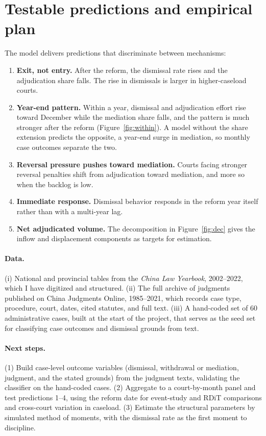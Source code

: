 \documentclass[11pt,letterpaper]{article}
\begin{document}
\section{Testable predictions and empirical plan}\label{sec:predictions}

The model delivers predictions that discriminate between mechanisms:
\begin{enumerate}\itemsep0.1em
\item \textbf{Exit, not entry.} After the reform, the dismissal rate rises and the adjudication share falls. The rise in dismissals is larger in higher-caseload courts.
\item \textbf{Year-end pattern.} Within a year, dismissal and adjudication effort rise toward December while the mediation share falls, and the pattern is much stronger after the reform (Figure~\ref{fig:within}). A model without the share extension predicts the opposite, a year-end surge in mediation, so monthly case outcomes separate the two.
\item \textbf{Reversal pressure pushes toward mediation.} Courts facing stronger reversal penalties shift from adjudication toward mediation, and more so when the backlog is low.
\item \textbf{Immediate response.} Dismissal behavior responds in the reform year itself rather than with a multi-year lag.
\item \textbf{Net adjudicated volume.} The decomposition in Figure~\ref{fig:dec} gives the inflow and displacement components as targets for estimation.
\end{enumerate}

\paragraph{Data.} (i) National and provincial tables from the \emph{China Law Yearbook}, 2002--2022, which I have digitized and structured. (ii) The full archive of judgments published on China Judgments Online, 1985--2021, which records case type, procedure, court, dates, cited statutes, and full text. (iii) A hand-coded set of 60 administrative cases, built at the start of the project, that serves as the seed set for classifying case outcomes and dismissal grounds from text.

\paragraph{Next steps.} (1) Build case-level outcome variables (dismissal, withdrawal or mediation, judgment, and the stated grounds) from the judgment texts, validating the classifier on the hand-coded cases. (2) Aggregate to a court-by-month panel and test predictions 1--4, using the reform date for event-study and RDiT comparisons and cross-court variation in caseload. (3) Estimate the structural parameters by simulated method of moments, with the dismissal rate as the first moment to discipline.
\end{document}
